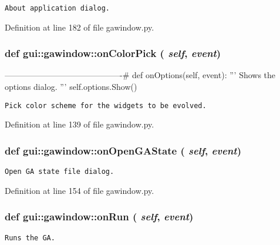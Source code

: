 \footnotesize\begin{verbatim}
About application dialog.
\end{verbatim}
\normalsize
 

Definition at line 182 of file gawindow.py.
\subsubsection{\setlength{\rightskip}{0pt plus 5cm}def gui::gawindow::onColorPick ( {\em self},  {\em event})}\label{namespacegui_1_1gawindow_ef2828d16cb5ca93e407c9fe92270908}


-------------------------------------------\# def onOptions(self, event): ''' Shows the options dialog. ''' self.options.Show() 

\footnotesize\begin{verbatim}
Pick color scheme for the widgets to be evolved.
\end{verbatim}
\normalsize
 

Definition at line 139 of file gawindow.py.
\subsubsection{\setlength{\rightskip}{0pt plus 5cm}def gui::gawindow::onOpenGAState ( {\em self},  {\em event})}\label{namespacegui_1_1gawindow_3c91cfb0bd3eac4c156e7c205fb68dda}




\footnotesize\begin{verbatim}
Open GA state file dialog.
\end{verbatim}
\normalsize
 

Definition at line 154 of file gawindow.py.
\subsubsection{\setlength{\rightskip}{0pt plus 5cm}def gui::gawindow::onRun ( {\em self},  {\em event})}\label{namespacegui_1_1gawindow_850b0d2a1da13a623bb37813242d24ad}




\footnotesize\begin{verbatim}
Runs the GA.
\end{verbatim}
\normalsize
 

